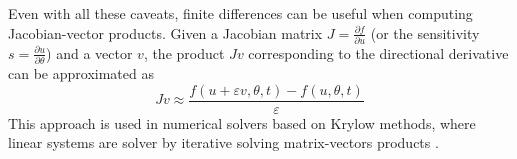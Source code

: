 Even with all these caveats, finite differences can be useful when computing Jacobian-vector products. 
Given a Jacobian matrix $J = \frac{\partial f}{\partial u}$ (or the sensitivity $s = \frac{\partial u}{\partial \theta}$) and a vector $v$, the product $Jv$ corresponding to the directional derivative can be approximated as 
\begin{equation}
    Jv \approx \frac{f(u + \varepsilon v, \theta, t) - f(u, \theta, t)}{\varepsilon}
\end{equation}
This approach is used in numerical solvers based on Krylow methods, where linear systems are solver by iterative solving matrix-vectors products \cite{Ipsen_Meyer_1998}.


